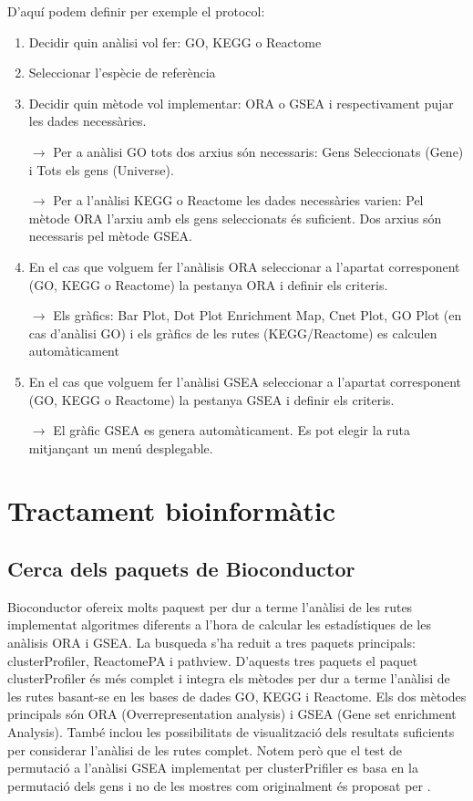 D'aquí podem definir per exemple el protocol:
\begin{enumerate}
\item Decidir quin anàlisi vol fer: GO, KEGG o Reactome
\item Seleccionar l'espècie de referència
\item Decidir quin mètode vol implementar: ORA o GSEA i respectivament pujar les dades necessàries.

$\rightarrow$ Per a anàlisi GO tots dos arxius són necessaris: Gens Seleccionats (Gene) i Tots els gens (Universe). 

$\rightarrow$ Per a l'anàlisi KEGG o Reactome les dades necessàries varien: Pel mètode ORA l'arxiu amb els gens seleccionats és suficient. Dos arxius són necessaris pel mètode GSEA.
\item En el cas que volguem fer l'anàlisis ORA seleccionar a l'apartat corresponent (GO, KEGG o Reactome) la pestanya ORA i definir els criteris.

$\rightarrow$ Els gràfics: Bar Plot, Dot Plot Enrichment Map, Cnet Plot, GO Plot (en cas d'anàlisi GO) i els gràfics de les rutes (KEGG/Reactome) es calculen automàticament

\item En el cas que volguem fer l'anàlisi GSEA seleccionar a l'apartat corresponent (GO, KEGG o Reactome) la pestanya GSEA i definir els criteris.

$\rightarrow$ El gràfic GSEA es genera automàticament. Es pot elegir la ruta mitjançant un menú desplegable.

\end{enumerate}

\chapter{Tractament bioinformàtic}

\section{Cerca dels paquets de Bioconductor}
Bioconductor ofereix molts paquest per dur a terme l'anàlisi de les rutes implementat algoritmes diferents a l'hora de calcular les estadístiques de les anàlisis ORA i GSEA. La busqueda s'ha reduit a tres paquets principals: clusterProfiler, ReactomePA i pathview. D'aquests tres paquets  el paquet clusterProfiler és més complet i integra els mètodes per dur a terme l'anàlisi de les rutes basant-se en les bases de dades GO, KEGG i Reactome. Els dos mètodes principals són ORA (Overrepresentation analysis) i GSEA (Gene set enrichment Analysis). També inclou les possibilitats de visualització dels resultats suficients per considerar l'anàlisi de les rutes complet. Notem però que el test de permutació a l'anàlisi GSEA implementat per clusterPrifiler es basa en la permutació dels gens i no de les mostres com originalment és proposat per \cite{subramanian2005gene}.

